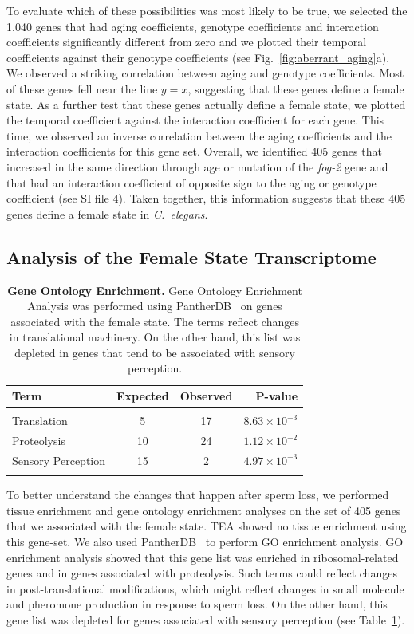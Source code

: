 \documentclass[10pt,letterpaper,twocolumn]{article}
\newcommand{\cel}{\emph{C.~elegans}}
\newcommand{\fog}{\emph{\mbox{fog-2}}}
\newcommand{\intersectn}{1,040}
\newcommand{\femalen}{405}
\newcommand{\ra}[1]{\renewcommand{\arraystretch}{#1}}
\begin{document}
To evaluate which of these possibilities was most likely to be true, we selected
the \intersectn{} genes that had aging coefficients, genotype coefficients and
interaction coefficients significantly different from zero and we plotted their
temporal coefficients against their genotype coefficients (see
Fig.~\ref{fig:aberrant_aging}a). We observed a striking correlation between
aging and genotype coefficients. Most of these genes fell near the line $y=x$,
suggesting that these genes define a female state. As a further test that these
genes actually define a female state, we plotted the temporal coefficient
against the interaction coefficient for each gene.
This time, we observed an inverse correlation between the aging coefficients
and the interaction coefficients for this gene set. Overall, we identified
\femalen{} genes that increased in the same direction through age or mutation
of the \fog{} gene and that had an interaction coefficient of opposite sign to
the aging or genotype coefficient (see SI file 4). Taken together, this
information suggests that these \femalen{} genes define a female state in
\cel{}.

\subsection*{Analysis of the Female State Transcriptome}
\begin{table}
\renewcommand{\familydefault}{\sfdefault}\normalfont{}
\centering{}
\ra{1.3}
\caption{
\textbf{Gene Ontology Enrichment.} Gene Ontology Enrichment Analysis
was performed using PantherDB~\cite{Mi2009} on genes associated with the female
state. The terms reflect changes in translational machinery. On the other hand,
this list was depleted in genes that tend to be associated with sensory
perception.
}
\begin{tabular}{@{}lccr@{}}
\toprule{}
Term & Expected & Observed & P-value\\
\bottomrule{}\\
Translation & 5 & 17 & $8.63\times{}10^{-3}$\\
Proteolysis &	10 &	24 &	$1.12\times{}10^{-2}$\\
Sensory Perception &	15 &	2 & $4.97\times{}10^{-3}$\\
\bottomrule{}
\end{tabular}
\label{tab:female_go}
\end{table}

To better understand the changes that happen after sperm loss, we performed
tissue enrichment and gene ontology enrichment analyses on the set of \femalen{}
genes that we associated with the female state. TEA showed no tissue
enrichment using this gene-set. We also used PantherDB~\cite{Mi2009} to perform
GO enrichment analysis. GO enrichment analysis showed that this gene list was
enriched in ribosomal-related genes and in genes associated with proteolysis.
Such terms could reflect changes in post-translational modifications, which
might reflect changes in small molecule and pheromone production in response to
sperm loss. On the other hand, this gene list was depleted for genes associated
with sensory perception (see Table~\ref{tab:female_go}).
\end{document}
